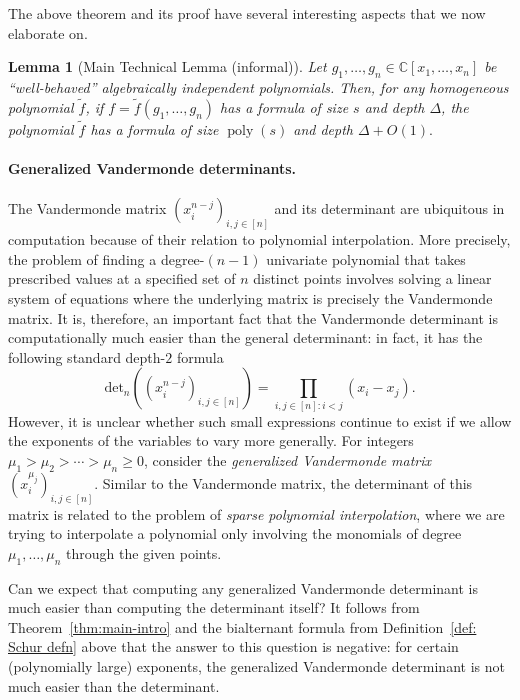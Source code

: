 \documentclass[10pt,a4paper]{article}
\newtheorem{lemma}[theorem]{Lemma}
\theoremstyle{definition}
\DeclareMathOperator{\poly}{poly}
\begin{document}
The above theorem and its proof have several interesting aspects that we now elaborate on. 

\begin{lemma}[Main Technical Lemma (informal)]\label{lem:key-intro}
Let $g_1,\ldots,g_n\in \mathbb{C}[x_1,\ldots,x_n]$ be ``well-behaved'' algebraically independent polynomials. Then, for any homogeneous polynomial $\tilde{f}$, if $f = \tilde{f}(g_1,\ldots,g_n)$ has a formula of size $s$ and depth $\Delta$, the polynomial $\tilde{f}$ has a formula of size $\poly(s)$ and depth $\Delta + O(1).$
\end{lemma}
\paragraph*{Generalized Vandermonde determinants.} The Vandermonde matrix $(x_i^{n-j})_{i,j\in [n]}$ and its determinant are ubiquitous in computation because of their relation to polynomial interpolation. More precisely, the problem of finding a degree-$(n-1)$ univariate polynomial that takes prescribed values at a specified set of $n$ distinct points involves solving a linear system of equations where the underlying matrix is precisely the Vandermonde matrix. It is, therefore, an important fact that the Vandermonde determinant is computationally much easier than the general determinant: in fact, it has the following standard depth-$2$ formula
\[
\mathrm{det}_n\left((x_i^{n-j})_{i,j\in [n]}\right) = \prod_{i,j\in [n]: i < j}(x_i - x_j).
\]
However, it is unclear whether such small expressions continue to exist if we allow the exponents of the variables to vary more generally. For integers $\mu_1 > \mu_2 > \cdots > \mu_n \geq 0$, consider the \emph{generalized Vandermonde matrix} $(x_i^{\mu_j})_{i,j\in [n]}$. Similar to the Vandermonde matrix, the determinant of this matrix is related to the problem of \emph{sparse polynomial interpolation}, where we are trying to interpolate a polynomial only involving  the monomials of degree $\mu_1,\ldots,\mu_n$ through the given points. 

Can we expect that computing any generalized Vandermonde determinant is much easier than computing the determinant itself? It follows from Theorem~\ref{thm:main-intro} and the bialternant formula from Definition~\ref{def: Schur defn} above that the answer to this question is negative: for certain (polynomially large) exponents, the generalized Vandermonde determinant is not much easier than the determinant.
\end{document}
